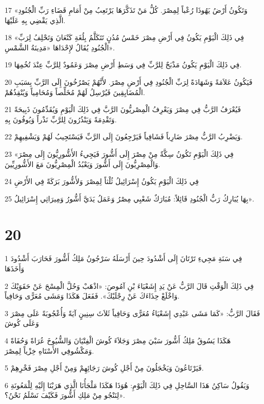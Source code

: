 \par 17 «وَتَكُونُ أَرْضُ يَهُوذَا رُعْباً لِمِصْرَ. كُلُّ مَنْ تَذَكَّرَهَا يَرْتَعِبُ مِنْ أَمَامِ قَضَاءِ رَبِّ الْجُنُودِ الَّذِي يَقْضِي بِهِ عَلَيْهَا.
\par 18 «فِي ذَلِكَ الْيَوْمِ يَكُونُ فِي أَرْضِ مِصْرَ خَمْسُ مُدُنٍ تَتَكَلَّمُ بِلُغَةِ كَنْعَانَ وَتَحْلِفُ لِرَبِّ الْجُنُودِ يُقَالُ لإِحْدَاهَا «مَدِينَةُ الشَّمْسِ».
\par 19 فِي ذَلِكَ الْيَوْمِ يَكُونُ مَذْبَحٌ لِلرَّبِّ فِي وَسَطِ أَرْضِ مِصْرَ وَعَمُودٌ لِلرَّبِّ عِنْدَ تُخُمِهَا.
\par 20 فَيَكُونُ عَلاَمَةً وَشَهَادَةً لِرَبِّ الْجُنُودِ فِي أَرْضِ مِصْرَ. لأَنَّهُمْ يَصْرُخُونَ إِلَى الرَّبِّ بِسَبَبِ الْمُضَايِقِينَ فَيُرْسِلُ لَهُمْ مُخَلِّصاً وَمُحَامِياً وَيُنْقِذُهُمْ.
\par 21 فَيُعْرَفُ الرَّبُّ فِي مِصْرَ وَيَعْرِفُ الْمِصْريُّونَ الرَّبَّ فِي ذَلِكَ الْيَوْمِ وَيُقَدِّمُونَ ذَبِيحَةً وَتَقْدِمَةً وَيَنْذُرُونَ لِلرَّبِّ نَذْراً وَيُوفُونَ بِهِ.
\par 22 وَيَضْرِبُ الرَّبُّ مِصْرَ ضَارِباً فَشَافِياً فَيَرْجِعُونَ إِلَى الرَّبِّ فَيَسْتَجِيبُ لَهُمْ وَيَشْفِيهِمْ.
\par 23 «فِي ذَلِكَ الْيَوْمِ تَكُونُ سِكَّةٌ مِنْ مِصْرَ إِلَى أَشُّورَ فَيَجِيءُ الأَشُّورِيُّونَ إِلَى مِصْرَ وَالْمِصْرِيُّونَ إِلَى أَشُّورَ وَيَعْبُدُ الْمِصْرِيُّونَ مَعَ الأَشُّورِيِّينَ.
\par 24 فِي ذَلِكَ الْيَوْمِ يَكُونُ إِسْرَائِيلُ ثُلْثاً لِمِصْرَ وَلأَشُّورَ بَرَكَةً فِي الأَرْضِ
\par 25 بِهَا يُبَارِكُ رَبُّ الْجُنُودِ قَائِلاً: مُبَارَكٌ شَعْبِي مِصْرُ وَعَمَلُ يَدَيَّ أَشُّورُ وَمِيرَاثِي إِسْرَائِيلُ».

\chapter{20}

\par 1 فِي سَنَةِ مَجِيءِ تَرْتَانَ إِلَى أَشْدُودَ حِينَ أَرْسَلَهُ سَرْجُونُ مَلِكُ أَشُّورَ فَحَارَبَ أَشْدُودَ وَأَخَذَهَا
\par 2 فِي ذَلِكَ الْوَقْتِ قَالَ الرَّبُّ عَنْ يَدِ إِشَعْيَاءَ بْنِ آمُوصَ: «اذْهَبْ وَحُلَّ الْمِسْحَ عَنْ حَقَوَيْكَ وَاخْلَعْ حِذَاءَكَ عَنْ رِجْلَيْكَ». فَفَعَلَ هَكَذَا وَمَشَى مُعَرًّى وَحَافِياً.
\par 3 فَقَالَ الرَّبُّ: «كَمَا مَشَى عَبْدِي إِشَعْيَاءُ مُعَرًّى وَحَافِياً ثَلاَثَ سِنِينٍ آيَةً وَأُعْجُوبَةً عَلَى مِصْرَ وَعَلَى كُوشَ
\par 4 هَكَذَا يَسُوقُ مَلِكُ أَشُّورَ سَبْيَ مِصْرَ وَجَلاَءَ كُوشَ الْفِتْيَانَ وَالشُّيُوخَ عُرَاةً وَحُفَاةً وَمَكْشُوفِي الأَسْتَاهِ خِزْياً لِمِصْرَ.
\par 5 فَيَرْتَاعُونَ وَيَخْجَلُونَ مِنْ أَجْلِ كُوشَ رَجَائِهِمْ وَمِنْ أَجْلِ مِصْرَ فَخْرِهِمْ.
\par 6 وَيَقُولُ سَاكِنُ هَذَا السَّاحِلِ فِي ذَلِكَ الْيَوْمِ: هُوَذَا هَكَذَا مَلْجَأُنَا الَّذِي هَرَبْنَا إِلَيْهِ لِلْمَعُونَةِ لِنَنْجُو مِنْ مَلِكِ أَشُّورَ فَكَيْفَ نَسْلَمُ نَحْنُ؟».

